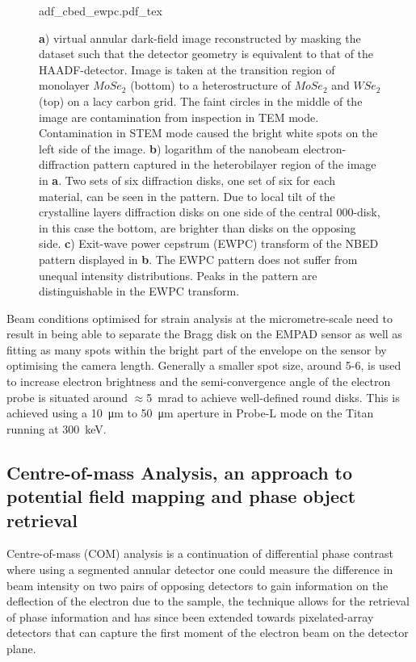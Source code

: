 \begin{figure}
	\centering
	\def\svgwidth{0.9\linewidth}
	{adf_cbed_ewpc.pdf_tex}
	\caption{\textbf{a}) virtual annular dark-field image reconstructed by masking the dataset such that the detector geometry is equivalent to that of the HAADF-detector. Image is taken at the transition region of monolayer $MoSe_2$ (bottom) to a heterostructure of $MoSe_2$ and $WSe_2$ (top) on a lacy carbon grid. The faint circles in the middle of the image are contamination from inspection in TEM mode. Contamination in STEM mode caused the bright white spots on the left side of the image. \textbf{b}) logarithm of the nanobeam electron-diffraction pattern captured in the heterobilayer region of the image in \textbf{a}. Two sets of six diffraction disks, one set of six for each material, can be seen in the pattern. Due to local tilt of the crystalline layers diffraction disks on one side of the central $000$-disk, in this case the bottom, are brighter than disks on the opposing side. \textbf{c}) Exit-wave power cepstrum (EWPC) transform of the NBED pattern displayed in \textbf{b}. The EWPC pattern does not suffer from unequal intensity distributions. Peaks in the pattern are distinguishable in the EWPC transform.}
	\label{fig:adf_nbed_ewpc}
\end{figure}

Beam conditions optimised for strain analysis at the micrometre-scale need to result in being able to separate the Bragg disk on the EMPAD sensor as well as fitting as many spots within the bright part of the envelope on the sensor by optimising the camera length. Generally a smaller spot size, around 5-6, is used to increase electron brightness and the semi-convergence angle of the electron probe is situated around $\approx$\SI{5}{\milli\radian} to achieve well-defined round disks. 
%
This is achieved using a \SI{10}{\micro\meter} to \SI{50}{\micro\meter} aperture in Probe-L mode on the Titan running at \SI{300}{\kilo\electronvolt}.



\subsection{Centre-of-mass Analysis, an approach to potential field mapping and phase object retrieval}
Centre-of-mass (COM) analysis is a continuation of differential phase contrast where using a segmented annular detector one could measure the difference in beam intensity on two pairs of opposing detectors to gain information on the deflection of the electron due to the sample, the technique allows for the retrieval of phase information and has since been extended towards pixelated-array detectors that can capture the first moment of the electron beam on the detector plane. 

